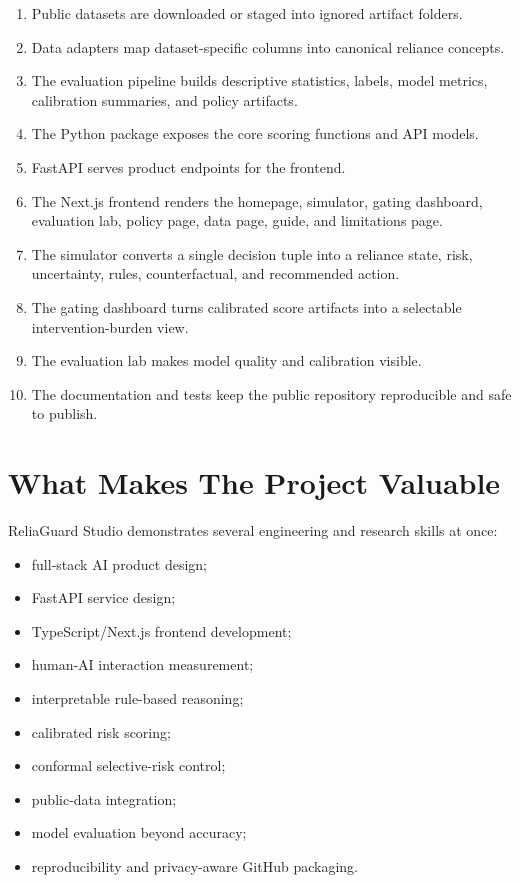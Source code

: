 \documentclass[11pt]{article}
\newcommand{\product}{ReliaGuard Studio}
\begin{document}
\begin{enumerate}[leftmargin=*]
  \item Public datasets are downloaded or staged into ignored artifact folders.
  \item Data adapters map dataset-specific columns into canonical reliance concepts.
  \item The evaluation pipeline builds descriptive statistics, labels, model metrics, calibration summaries, and policy artifacts.
  \item The Python package exposes the core scoring functions and API models.
  \item FastAPI serves product endpoints for the frontend.
  \item The Next.js frontend renders the homepage, simulator, gating dashboard, evaluation lab, policy page, data page, guide, and limitations page.
  \item The simulator converts a single decision tuple into a reliance state, risk, uncertainty, rules, counterfactual, and recommended action.
  \item The gating dashboard turns calibrated score artifacts into a selectable intervention-burden view.
  \item The evaluation lab makes model quality and calibration visible.
  \item The documentation and tests keep the public repository reproducible and safe to publish.
\end{enumerate}

\section{What Makes The Project Valuable}

\product{} demonstrates several engineering and research skills at once:

\begin{itemize}[leftmargin=*]
  \item full-stack AI product design;
  \item FastAPI service design;
  \item TypeScript/Next.js frontend development;
  \item human-AI interaction measurement;
  \item interpretable rule-based reasoning;
  \item calibrated risk scoring;
  \item conformal selective-risk control;
  \item public-data integration;
  \item model evaluation beyond accuracy;
  \item reproducibility and privacy-aware GitHub packaging.
\end{itemize}
\end{document}
